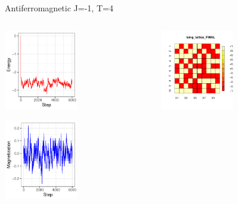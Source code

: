 \documentclass{beamer}
\begin{document}
\begin{frame}{Antiferromagnetic J=-1, T=4}
\begin{columns}
\begin{column}{0.5\textwidth}
    \begin{center}
     \includegraphics[width=0.5\textwidth]{Pic/J-1_60_2500_T=4_ENERGY.pdf}
     \end{center}
         \begin{center}
     \includegraphics[width=0.5\textwidth]{Pic/J-1_60_2500_T=4_Magnetization.pdf}
     \end{center}
\end{column}
\begin{column}{0.5\textwidth}
    \begin{center}
     \includegraphics[width=0.5\textwidth]{Pic/J-1_60_2500_T=4_FINAL.pdf}

\end{center}
\end{column}
\end{columns}
\end{frame}
\end{document}
